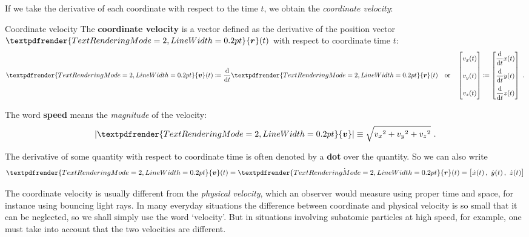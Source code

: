 \documentclass[a4paper,12pt,%
onecolumn,oneside,%
british%
]{memoir}
\renewcommand*{\bm}[1]{\textpdfrender{TextRenderingMode=2,LineWidth=0.2pt}{\boldsymbol{#1}}}
\newcommand*{\di}{\mathop{}\!\mathrm{d}}%
\newcommand*{\defd}{\coloneqq}
\DeclarePairedDelimiter\abs{\lvert}{\rvert}
\renewcommand*{\|}[1][]{\nonscript\:#1\vert\nonscript\:\mathopen{}}
\newcommand*{\yr}{\bm{r}}
\newcommand*{\yv}{\bm{v}}
\newcommand*{\dt}{\di t}
\begin{document}
If we take the derivative of each coordinate with respect to the time $t$, we obtain the \emph{coordinate velocity}:

\begin{definition}{Coordinate velocity}\label{def:coord_velocity}
  The \textbf{coordinate velocity} is a vector defined as the derivative of the position vector $\yr(t)$ with respect to coordinate time $t$:
  \begin{equation*}
    \yv(t) %
    \defd \frac{\di}{\dt}\yr(t)
    \quad\text{or}\quad
    \begin{bmatrix}
      v_{x}(t)\vphantom{\dfrac{\di}{\dt}}\\[3\jot]
      v_{y}(t)\vphantom{\dfrac{\di}{\dt}}\\[3\jot]
      v_{z}(t)\vphantom{\dfrac{\di}{\dt}}
    \end{bmatrix}
    \defd
    \begin{bmatrix}
      \dfrac{\di}{\dt} x(t)\\[3\jot]
      \dfrac{\di}{\dt} y(t)\\[3\jot]
      \dfrac{\di}{\dt} z(t)
    \end{bmatrix} \ .
  \end{equation*}

  \smallskip

  The word \textbf{speed} means the \emph{magnitude} of the velocity:
  \begin{equation*}
    \abs{\yv} \equiv \sqrt{{v_{x}}^{2} + {v_{y}}^{2} + {v_{z}}^{2}} \ .
  \end{equation*}

  \smallskip

    The derivative of some quantity with respect to coordinate time is often denoted by a \textbf{dot} over the quantity. So we can also write
    \begin{equation*}
      \yv(t) = \dot{\yr}(t) = \bigl[\dot{x}(t)\,,\ \dot{y}(t)\,,\ \dot{z}(t)\bigr]
    \end{equation*}
  \end{definition}
The coordinate velocity is usually different from the \emph{physical velocity}, which an observer would measure using proper time and space, for instance using bouncing light rays. In many everyday situations the difference between coordinate and physical velocity is so small that it can be neglected, so we shall simply use the word \enquote*{velocity}. But in situations involving subatomic particles at high speed, for example, one must take into account that the two velocities are different.
\end{document}

